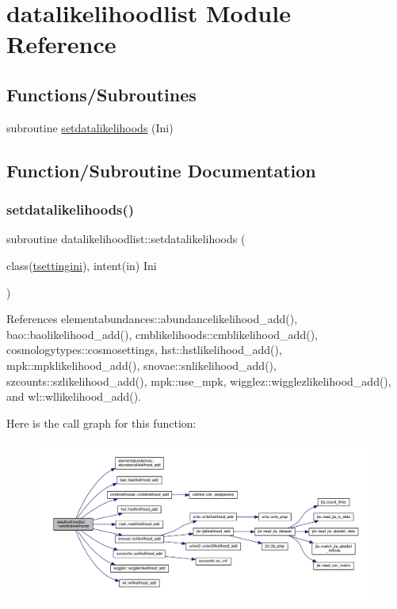 \hypertarget{namespacedatalikelihoodlist}{}\section{datalikelihoodlist Module Reference}
\label{namespacedatalikelihoodlist}
\subsection*{Functions/\+Subroutines}
\begin{DoxyCompactItemize}
\item 
subroutine \mbox{\hyperlink{namespacedatalikelihoodlist_ada6561e1822bb1effcfc8bfaa373cc6b}{setdatalikelihoods}} (Ini)
\end{DoxyCompactItemize}


\subsection{Function/\+Subroutine Documentation}
\mbox{\label{namespacedatalikelihoodlist_ada6561e1822bb1effcfc8bfaa373cc6b}} 
\subsubsection{\texorpdfstring{setdatalikelihoods()}{setdatalikelihoods()}}
{\footnotesize\ttfamily subroutine datalikelihoodlist\+::setdatalikelihoods (\begin{DoxyParamCaption}\item[{class(\mbox{\hyperlink{structsettings_1_1tsettingini}{tsettingini}}), intent(in)}]{Ini }\end{DoxyParamCaption})}



References elementabundances\+::abundancelikelihood\+\_\+add(), bao\+::baolikelihood\+\_\+add(), cmblikelihoods\+::cmblikelihood\+\_\+add(), cosmologytypes\+::cosmosettings, hst\+::hstlikelihood\+\_\+add(), mpk\+::mpklikelihood\+\_\+add(), snovae\+::snlikelihood\+\_\+add(), szcounts\+::szlikelihood\+\_\+add(), mpk\+::use\+\_\+mpk, wigglez\+::wigglezlikelihood\+\_\+add(), and wl\+::wllikelihood\+\_\+add().

Here is the call graph for this function\+:
\nopagebreak
\begin{figure}[H]
\begin{center}
\leavevmode
\includegraphics[width=350pt]{namespacedatalikelihoodlist_ada6561e1822bb1effcfc8bfaa373cc6b_cgraph}
\end{center}
\end{figure}
